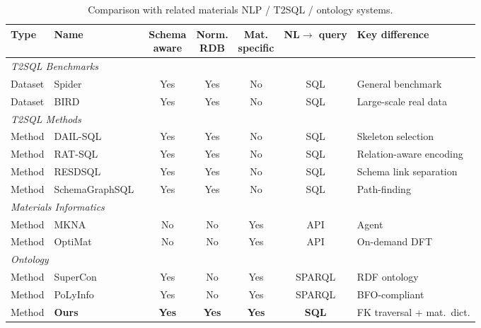 \documentclass[sn-mathphys,Numbered]{sn-jnl}
\begin{document}
\begin{CJK}{UTF8}{min}
\begin{table}[htbp]
  \centering
  \caption{Comparison with related materials NLP / T2SQL / ontology systems.}
  \label{tab:related_comparison}
  \small
  \begin{tabularx}{\textwidth}{llccccX}
    \toprule
    Type & Name & \shortstack{Schema\\aware} & \shortstack{Norm.\\RDB} & \shortstack{Mat.\\specific} & \shortstack{NL$\to$\\query} & Key difference \\
    \midrule
    \multicolumn{7}{l}{\textit{T2SQL Benchmarks}} \\
    Dataset & Spider~\cite{yu2018spider} & Yes & Yes & No & SQL & General benchmark \\
    Dataset & BIRD~\cite{li2024bird} & Yes & Yes & No & SQL & Large-scale real data \\
    \midrule
    \multicolumn{7}{l}{\textit{T2SQL Methods}} \\
    Method & DAIL-SQL~\cite{gao2023dail} & Yes & Yes & No & SQL & Skeleton selection \\
    Method & RAT-SQL~\cite{wang2020ratsql} & Yes & Yes & No & SQL & Relation-aware encoding \\
    Method & RESDSQL~\cite{li2023resdsql} & Yes & Yes & No & SQL & Schema link separation \\
    Method & SchemaGraphSQL~\cite{safdarian2026schemagraphsql} & Yes & Yes & No & SQL & Path-finding \\
    \midrule
    \multicolumn{7}{l}{\textit{Materials Informatics}} \\
    Method & MKNA~\cite{zhuang2026mkna} & No & No & Yes & API & Agent \\
    Method & OptiMat~\cite{hu2026optimat} & No & No & Yes & API & On-demand DFT \\
    \midrule
    \multicolumn{7}{l}{\textit{Ontology}} \\
    Method & SuperCon~\cite{ishii2023supercon} & Yes & No & Yes & SPARQL & RDF ontology \\
    Method & PoLyInfo~\cite{ishii2024polyinfo} & Yes & No & Yes & SPARQL & BFO-compliant \\
    \midrule
    Method & \textbf{Ours} & \textbf{Yes} & \textbf{Yes} & \textbf{Yes} & \textbf{SQL} & FK traversal + mat.\ dict. \\
    \bottomrule
  \end{tabularx}
\end{table}


\end{CJK}
\end{document}
